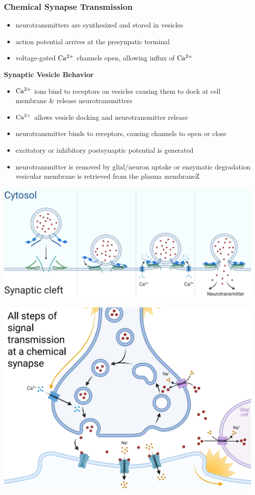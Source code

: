 \documentclass[11pt,fleqn]{book}
\begin{document}
\subsubsection{Chemical Synapse Transmission}
\begin{itemize}
    \item neurotransmitters are synthesized and stored in vesicles
    \item action potential arrives at the presynpatic terminal
    \item voltage-gated ${\rm Ca^{2+}}$ channels open, allowing influx of ${\rm Ca^{2+}}$
\end{itemize}
\textbf{Synaptic Vesicle Behavior} 
\begin{itemize}
    \item ${\rm Ca^{2+}}$ ions bind to receptors on vesicles causing them to dock at cell membrane \& release neurotransmitters
    \item ${\rm Ca^{2+}}$ allows vesicle docking and neurotransmitter release
    \item neurotransmitter binds to receptors, causing channels to open or close
    \item excitatory or inhibitory postsynaptic potential is generated
    \item neurotransmitter is removed by glial/neuron uptake or enzymatic degradation
    vesicular membrane is retrieved from the plasma membraneZ
\end{itemize}
\begin{center}
    \includegraphics[width=0.65\linewidth]{Pictures/Screenshot 2024-02-26 011050.png}
\end{center}
\begin{center}
    \includegraphics[width=0.65\linewidth]{Pictures/Screenshot 2024-02-26 011404.png}
\end{center}
\end{document}
